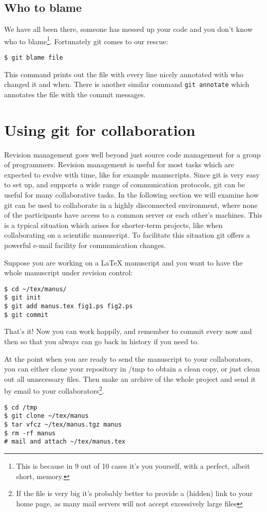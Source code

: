 \documentclass[a4paper,10pt]{article}
\begin{document}
\subsection{Who to blame}
We have all been there, someone has messed up your code and you don't know who
to blame\footnote{This is because in 9 out of 10 cases it's you yourself,
with a perfect, albeit short, memory.}.
Fortunately git comes to our rescue:
\begin{verbatim}
$ git blame file
\end{verbatim}
This command prints out the file with every line nicely annotated with who 
changed it and when. There is another similar command \texttt{git annotate}
which annotates the file with the commit messages. 

\section{Using git for collaboration}
Revision management goes well beyond just source code management for a group
of programmers. Revision management is useful for most tasks which are
expected to evolve with time, like for example manuscripts.
Since git is very easy to set up, and supports a wide range of communication
protocols, git can be useful for many collaborative tasks. In the following
section we will examine how git can be used to collaborate in a highly
disconnected environment, where none of the participants have access to a
common server or each other's machines. This is a typical situation which
arises for shorter-term projects, like when collaborating on a scientific
manuscript. To facilitate this situation git offers a powerful e-mail facility
for communication changes.

Suppose you are working on a LaTeX manuscript and you want to have the whole
manuscript under revision control:
\begin{verbatim}
$ cd ~/tex/manus/
$ git init
$ git add manus.tex fig1.ps fig2.ps
$ git commit
\end{verbatim}
That's it! Now you can work happily, and remember to commit every now and then
so that you always can go back in history if you need to. 

At the point when you are ready to send the manuscript to your collaborators,
you can either clone your repository in /tmp to obtain a clean copy, or just
clean out all unnecessary files. Then make an archive of the whole project and
send it by email to your collaborators\footnote{If the file is very big it's
probably better to provide a (hidden) link to your home page, as many mail
servers will not accept excessively large files}. 
\begin{verbatim}
$ cd /tmp
$ git clone ~/tex/manus
$ tar vfcz ~/tex/manus.tgz manus
$ rm -rf manus
# mail and attach ~/tex/manus.tex
\end{verbatim}
\end{document}
